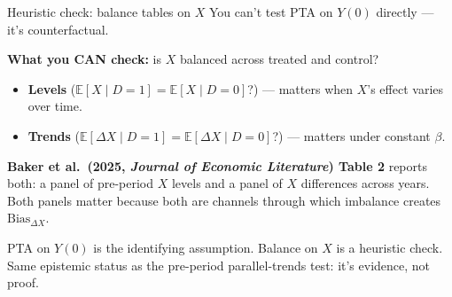 \documentclass[aspectratio=169,11pt]{beamer}
\begin{document}
\begin{frame}{Heuristic check: balance tables on $X$}
\footnotesize
You can't test PTA on $Y(0)$ directly --- it's counterfactual.

\vspace{0.4em}
\textbf{What you CAN check:} \;is $X$ balanced across treated and control?
\begin{itemize}\setlength\itemsep{2pt}
  \item \textbf{Levels} ($\mathbb{E}[X \mid D{=}1] = \mathbb{E}[X \mid D{=}0]$?) --- matters when $X$'s effect varies over time.
  \item \textbf{Trends} ($\mathbb{E}[\Delta X \mid D{=}1] = \mathbb{E}[\Delta X \mid D{=}0]$?) --- matters under constant $\beta$.
\end{itemize}

\vspace{0.5em}
\textbf{Baker et al.\ (2025, \textit{Journal of Economic Literature}) Table 2} reports both: a panel of pre-period $X$ levels and a panel of $X$ differences across years. \;Both panels matter because both are channels through which imbalance creates $\text{Bias}_{\Delta X}$.

\vspace{0.5em}
 \;PTA on $Y(0)$ is the identifying assumption. \;Balance on $X$ is a heuristic check. \;Same epistemic status as the pre-period parallel-trends test: it's evidence, not proof.
\end{frame}

\end{document}

